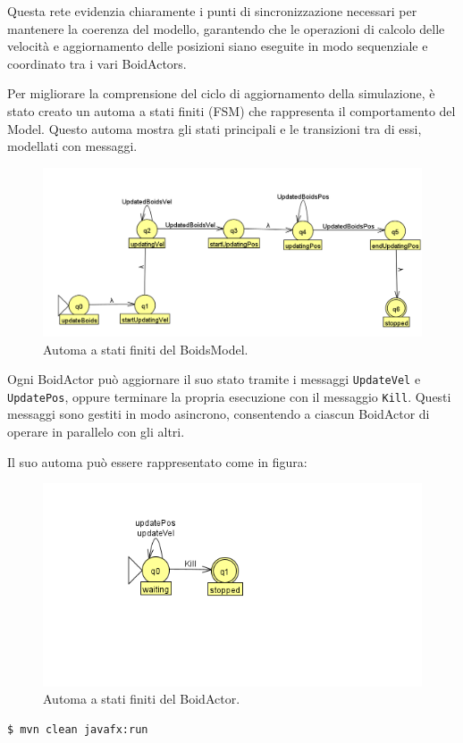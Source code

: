\documentclass[a4paper,12pt]{report}
\begin{document}
        Questa rete evidenzia chiaramente i punti di sincronizzazione necessari per mantenere la coerenza del modello, garantendo che le operazioni di calcolo delle velocità e aggiornamento delle posizioni siano eseguite in modo sequenziale e coordinato tra i vari BoidActors.

        Per migliorare la comprensione del ciclo di aggiornamento della simulazione, è stato creato un automa a stati finiti (FSM) che rappresenta il comportamento del Model. Questo automa mostra gli stati principali e le transizioni tra di essi, modellati con messaggi.

        \begin{figure}[ht!]
            \centering
            \includegraphics[width=\textwidth]{img/FSM/BoidsModel.png}
            \caption{Automa a stati finiti del BoidsModel.}
            \label{fig:Boids_model_fsm}
        \end{figure}

        Ogni BoidActor può aggiornare il suo stato tramite i messaggi \texttt{UpdateVel} e \texttt{UpdatePos}, oppure terminare la propria esecuzione con il messaggio \texttt{Kill}. Questi messaggi sono gestiti in modo asincrono, consentendo a ciascun BoidActor di operare in parallelo con gli altri.

        Il suo automa può essere rappresentato come in figura:
        \begin{figure}[ht!]
            \centering
            \includegraphics[width=\textwidth]{img/FSM/BoidActor.png}
            \caption{Automa a stati finiti del BoidActor.}
            \label{fig:Boid_actor_fsm}
        \end{figure}

        \begin{lstlisting}[style=bash, caption={Avvio dello script}]
            $ mvn clean javafx:run
        \end{lstlisting}
    
    
\end{document}
